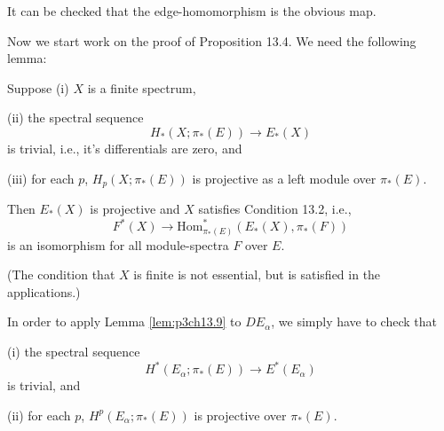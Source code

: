 \documentclass[../main]{subfiles}
\begin{document}
It can be checked that the edge-homomorphism is the obvious map.

Now we start work on the proof of Proposition 13.4. We need the following lemma:
\begin{lemma}\label{lem:p3ch13.9}
Suppose (i) $X$ is a finite spectrum,

(ii) the spectral sequence
\[H_\ast(X;\pi_\ast(E)) \longrightarrow E_\ast(X)\]
is trivial, i.e., it's differentials are zero, and

(iii) for each $p$, $H_p(X;\pi_\ast(E))$ is projective as a left module over $\pi_\ast(E)$.

Then $E_\ast(X)$ is projective and $X$ satisfies Condition 13.2, i.e., 
\[F^\ast(X) \longrightarrow \text{Hom}^\ast_{\pi_\ast(E)}(E_\ast(X), \pi_\ast(F))\]
is an isomorphism for all module-spectra $F$ over $E$.

(The condition that $X$ is finite is not essential, but is satisfied in the applications.)

In order to apply Lemma \ref{lem:p3ch13.9} to $DE_\alpha$, we simply have to check that

(i) the spectral sequence
\[H^\ast(E_\alpha;\pi_\ast(E)) \longrightarrow E^\ast(E_\alpha)\]
is trivial, and

(ii) for each $p$, $H^p(E_\alpha;\pi_\ast(E))$ is projective over $\pi_\ast(E)$.
\end{lemma}
\end{document}
